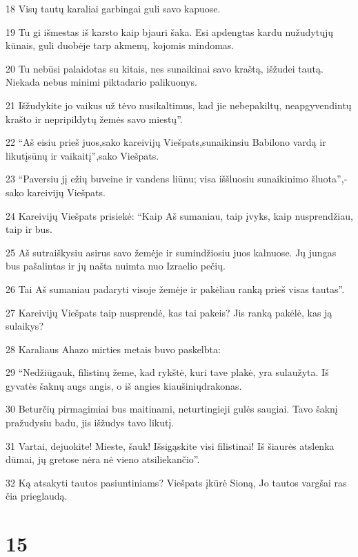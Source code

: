 \par 18 Visų tautų karaliai garbingai guli savo kapuose. 
\par 19 Tu gi išmestas iš karsto kaip bjauri šaka. Esi apdengtas kardu nužudytųjų kūnais, guli duobėje tarp akmenų, kojomis mindomas. 
\par 20 Tu nebūsi palaidotas su kitais, nes sunaikinai savo kraštą, išžudei tautą. Niekada nebus minimi piktadario palikuonys. 
\par 21 Išžudykite jo vaikus už tėvo nusikaltimus, kad jie nebepakiltų, neapgyvendintų krašto ir nepripildytų žemės savo miestų”. 
\par 22 “Aš eisiu prieš juos,­sako kareivijų Viešpats,­sunaikinsiu Babilono vardą ir likutį­sūnų ir vaikaitį”,­sako Viešpats. 
\par 23 “Paversiu jį ežių buveine ir vandens liūnu; visa iššluosiu sunaikinimo šluota”,­sako kareivijų Viešpats. 
\par 24 Kareivijų Viešpats prisiekė: “Kaip Aš sumaniau, taip įvyks, kaip nusprendžiau, taip ir bus. 
\par 25 Aš sutraiškysiu asirus savo žemėje ir sumindžiosiu juos kalnuose. Jų jungas bus pašalintas ir jų našta nuimta nuo Izraelio pečių. 
\par 26 Tai Aš sumaniau padaryti visoje žemėje ir pakėliau ranką prieš visas tautas”. 
\par 27 Kareivijų Viešpats taip nusprendė, kas tai pakeis? Jis ranką pakėlė, kas ją sulaikys? 
\par 28 Karaliaus Ahazo mirties metais buvo paskelbta: 
\par 29 “Nedžiūgauk, filistinų žeme, kad rykštė, kuri tave plakė, yra sulaužyta. Iš gyvatės šaknų augs angis, o iš angies kiaušinių­drakonas. 
\par 30 Beturčių pirmagimiai bus maitinami, neturtingieji gulės saugiai. Tavo šaknį pražudysiu badu, jis išžudys tavo likutį. 
\par 31 Vartai, dejuokite! Mieste, šauk! Išsigąskite visi filistinai! Iš šiaurės atslenka dūmai, jų gretose nėra nė vieno atsiliekančio”. 
\par 32 Ką atsakyti tautos pasiuntiniams? Viešpats įkūrė Sioną, Jo tautos vargšai ras čia prieglaudą.



\chapter{15}


